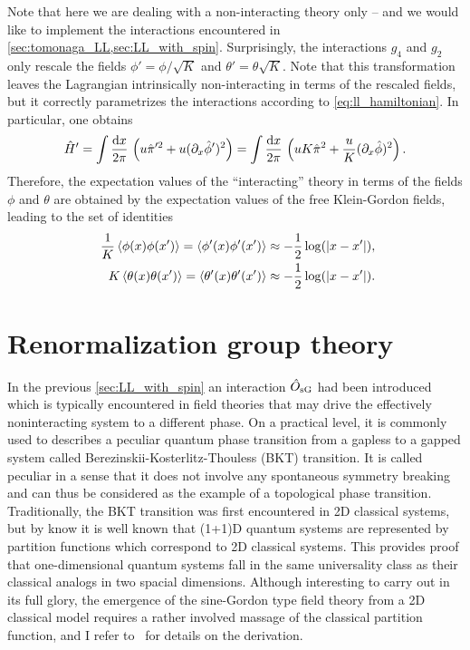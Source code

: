 Note that here we are dealing with a non-interacting theory only -- and we would like to implement the interactions encountered in \cref{sec:tomonaga_LL,sec:LL_with_spin}.
Surprisingly, the interactions $g_4$ and $g_2$ only rescale the fields $\phi'=\phi/\sqrt K$ and $\theta'=\theta\sqrt K$.
Note that this transformation leaves the Lagrangian intrinsically non-interacting in terms of the rescaled fields, but it correctly parametrizes the interactions according to \cref{eq:ll_hamiltonian}.
In particular, one obtains
\begin{align}
    \hat H' = \int\frac{\mathrm d x}{2\pi}\, \left( u\hat\pi'^2 + u(\partial_x\hat\phi')^2 \right) = \int\frac{\mathrm d x}{2\pi}\, \left( uK\hat\pi^2 + \frac uK(\partial_x\hat\phi)^2 \right).
\end{align}
Therefore, the expectation values of the ``interacting'' theory in terms of the fields $\phi$ and $\theta$ are obtained by the expectation values of the free Klein-Gordon fields, leading to the set of identities
\begin{align}
    \frac1K\braket{\phi(x)\phi(x')} = \braket{\phi'(x)\phi'(x')} \approx -\frac12\log(|x-x'|),\\
    \quad
    K\braket{\theta(x)\theta(x')} = \braket{\theta'(x)\theta'(x')} \approx -\frac12\log(|x-x'|).
\end{align}
%
%
\section{Renormalization group theory}
\label{sec:renormalization_group_theory}
In the previous \cref{sec:LL_with_spin} an interaction $\hat O_{\rm sG}$ had been introduced which is typically encountered in field theories that may drive the effectively noninteracting system to a different phase.
On a practical level, it is commonly used to describes a peculiar quantum phase transition from a gapless to a gapped system called Berezinskii-Kosterlitz-Thouless (BKT) transition.
It is called peculiar in a sense that it does not involve any spontaneous symmetry breaking and can thus be considered as the example of a topological phase transition.
Traditionally, the BKT transition was first encountered in 2D classical systems, but by know it is well known that (1+1)D quantum systems are represented by partition functions which correspond to 2D classical systems.
This provides proof that one-dimensional quantum systems fall in the same universality class as their classical analogs in two spacial dimensions.
Although interesting to carry out in its full glory, the emergence of the sine-Gordon type field theory from a 2D classical model requires a rather involved massage of the classical partition function, and I refer to~\cite{AltlandSimons2010} for details on the derivation.

